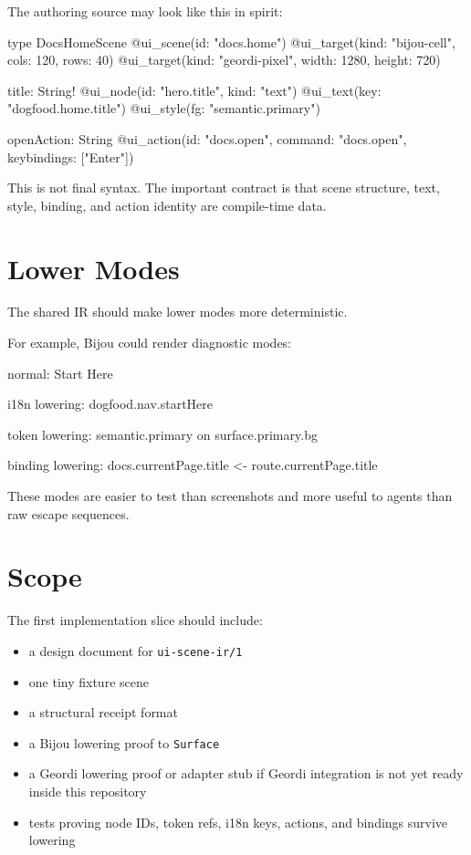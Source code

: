 The authoring source may look like this in spirit:

\begin{CodeBlock}
type DocsHomeScene
  @ui_scene(id: "docs.home")
  @ui_target(kind: "bijou-cell", cols: 120, rows: 40)
  @ui_target(kind: "geordi-pixel", width: 1280, height: 720) {
  title: String!
    @ui_node(id: "hero.title", kind: "text")
    @ui_text(key: "dogfood.home.title")
    @ui_style(fg: "semantic.primary")

  openAction: String
    @ui_action(id: "docs.open", command: "docs.open", keybindings: ["Enter"])
}
\end{CodeBlock}

This is not final syntax. The important contract is that scene structure, text, style, binding, and action identity are compile-time data.

\section{Lower Modes}\label{record-138-lower-modes}

The shared IR should make lower modes more deterministic.

For example, Bijou could render diagnostic modes:

\begin{CodeBlock}
normal:
  Start Here

i18n lowering:
  dogfood.nav.startHere

token lowering:
  semantic.primary on surface.primary.bg

binding lowering:
  docs.currentPage.title <- route.currentPage.title
\end{CodeBlock}

These modes are easier to test than screenshots and more useful to agents than raw escape sequences.

\section{Scope}\label{record-138-scope}

The first implementation slice should include:

\begin{itemize}
\tightlist
\item
  a design document for \texttt{u\allowbreak{}i\allowbreak{}-\allowbreak{}s\allowbreak{}c\allowbreak{}e\allowbreak{}n\allowbreak{}e\allowbreak{}-\allowbreak{}i\allowbreak{}r\allowbreak{}/\allowbreak{}1}
\item
  one tiny fixture scene
\item
  a structural receipt format
\item
  a Bijou lowering proof to \texttt{S\allowbreak{}u\allowbreak{}r\allowbreak{}f\allowbreak{}a\allowbreak{}c\allowbreak{}e}
\item
  a Geordi lowering proof or adapter stub if Geordi integration is not yet ready inside this repository
\item
  tests proving node IDs, token refs, i18n keys, actions, and bindings survive lowering
\end{itemize}

